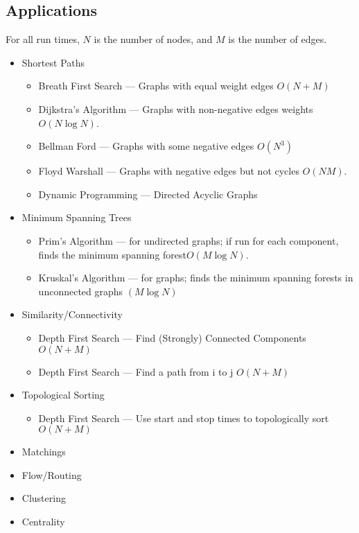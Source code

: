 \subsection{Applications}
For all run times, $N$ is the number of nodes, and $M$ is the number of edges.
\begin{itemize}
	\item Shortest Paths
		\begin{itemize}
			\item Breath First Search --- Graphs with equal weight edges $O(N+M)$
			\item Dijkstra's Algorithm --- Graphs with non-negative edges weights $O(N \log N)$.
			\item Bellman Ford --- Graphs with some negative edges $O(N^3)$
			\item Floyd Warshall --- Graphs with negative edges but not cycles $O(NM)$.
			\item Dynamic Programming --- Directed Acyclic Graphs
		\end{itemize}
	\item Minimum Spanning Trees 
		\begin{itemize}
			\item Prim's Algorithm --- for undirected graphs; if run for each component, finds the minimum spanning forest$O(M \log N)$.
			\item Kruskal's Algorithm --- for graphs; finds the minimum spanning forests in unconnected graphs $(M \log N)$
		\end{itemize}
	\item Similarity/Connectivity
		\begin{itemize}
			\item Depth First Search --- Find (Strongly) Connected Components $O(N+M)$
			\item Depth First Search --- Find a path from i to j $O(N+M)$
		\end{itemize}
	\item Topological Sorting 
		\begin{itemize}
			\item Depth First Search --- Use start and stop times to topologically sort $O(N+M)$
		\end{itemize}
	\item Matchings
	\item Flow/Routing
	\item Clustering
	\item Centrality
\end{itemize}

